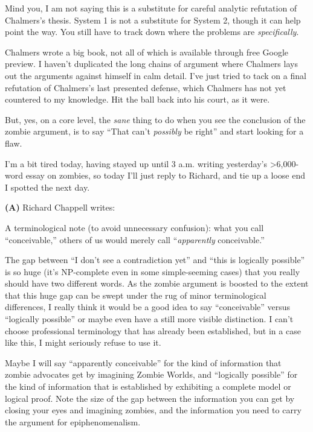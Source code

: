 {
 Mind you, I am not saying this is a substitute for careful
analytic refutation of Chalmers's thesis. System 1 is
not a substitute for System 2, though it can help point the way. You
still have to track down where the problems are \textit{specifically}.}

{
 Chalmers wrote a big book, not all of which is available through
free Google preview. I haven't duplicated the long
chains of argument where Chalmers lays out the arguments against
himself in calm detail. I've just tried to tack on a
final refutation of Chalmers's last presented defense,
which Chalmers has not yet countered to my knowledge. Hit the ball back
into his court, as it were.}

{
 But, yes, on a core level, the \textit{sane} thing to do when you
see the conclusion of the zombie argument, is to say
``That can't \textit{possibly} be
right'' and start looking for a flaw.}

\myendsectiontext


\bigskip


{
 I'm a bit tired today, having stayed up until 3
a.m. writing yesterday's {\textgreater}6,000-word essay
on zombies, so today I'll just reply to Richard, and
tie up a loose end I spotted the next day.}

{
 \textbf{(A)} Richard Chappell writes:}

{
 A terminological note (to avoid unnecessary confusion): what you
call ``conceivable,'' others of us
would merely call ``\textit{apparently}
conceivable.''}

{
 The gap between ``I don't see a
contradiction yet'' and ``this is
logically possible'' is so huge (it's
NP-complete even in some simple-seeming cases) that you really should
have two different words. As the zombie argument is boosted to the
extent that this huge gap can be swept under the rug of minor
terminological differences, I really think it would be a good idea to
say ``conceivable'' versus
``logically possible'' or maybe even
have a still more visible distinction. I can't choose
professional terminology that has already been established, but in a
case like this, I might seriously refuse to use it.}

{
 Maybe I will say ``apparently
conceivable'' for the kind of information that zombie
advocates get by imagining Zombie Worlds, and
``logically possible'' for the kind
of information that is established by exhibiting a complete model or
logical proof. Note the size of the gap between the information you can
get by closing your eyes and imagining zombies, and the information you
need to carry the argument for epiphenomenalism.}

